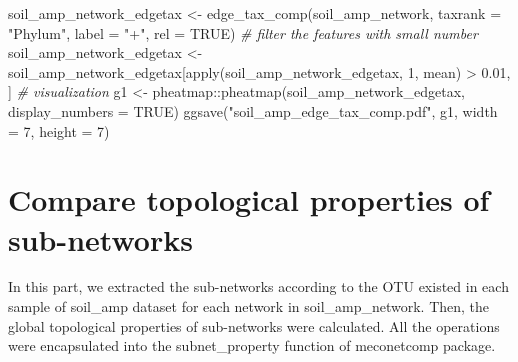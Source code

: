 \documentclass[
]{book}
\newenvironment{Shaded}{\begin{snugshade}}{\end{snugshade}}
\newcommand{\AttributeTok}[1]{\textcolor[rgb]{0.77,0.63,0.00}{#1}}
\newcommand{\CommentTok}[1]{\textcolor[rgb]{0.56,0.35,0.01}{\textit{#1}}}
\newcommand{\ConstantTok}[1]{\textcolor[rgb]{0.00,0.00,0.00}{#1}}
\newcommand{\DecValTok}[1]{\textcolor[rgb]{0.00,0.00,0.81}{#1}}
\newcommand{\FloatTok}[1]{\textcolor[rgb]{0.00,0.00,0.81}{#1}}
\newcommand{\FunctionTok}[1]{\textcolor[rgb]{0.00,0.00,0.00}{#1}}
\newcommand{\NormalTok}[1]{#1}
\newcommand{\OtherTok}[1]{\textcolor[rgb]{0.56,0.35,0.01}{#1}}
\newcommand{\SpecialCharTok}[1]{\textcolor[rgb]{0.00,0.00,0.00}{#1}}
\newcommand{\StringTok}[1]{\textcolor[rgb]{0.31,0.60,0.02}{#1}}
\begin{document}
\begin{Shaded}
\begin{Highlighting}[]
\NormalTok{soil\_amp\_network\_edgetax }\OtherTok{\textless{}{-}} \FunctionTok{edge\_tax\_comp}\NormalTok{(soil\_amp\_network, }\AttributeTok{taxrank =} \StringTok{"Phylum"}\NormalTok{, }\AttributeTok{label =} \StringTok{"+"}\NormalTok{, }\AttributeTok{rel =} \ConstantTok{TRUE}\NormalTok{)}
\CommentTok{\# filter the features with small number}
\NormalTok{soil\_amp\_network\_edgetax }\OtherTok{\textless{}{-}}\NormalTok{ soil\_amp\_network\_edgetax[}\FunctionTok{apply}\NormalTok{(soil\_amp\_network\_edgetax, }\DecValTok{1}\NormalTok{, mean) }\SpecialCharTok{\textgreater{}} \FloatTok{0.01}\NormalTok{, ]}
\CommentTok{\# visualization}
\NormalTok{g1 }\OtherTok{\textless{}{-}}\NormalTok{ pheatmap}\SpecialCharTok{::}\FunctionTok{pheatmap}\NormalTok{(soil\_amp\_network\_edgetax, }\AttributeTok{display\_numbers =} \ConstantTok{TRUE}\NormalTok{)}
\FunctionTok{ggsave}\NormalTok{(}\StringTok{"soil\_amp\_edge\_tax\_comp.pdf"}\NormalTok{, g1, }\AttributeTok{width =} \DecValTok{7}\NormalTok{, }\AttributeTok{height =} \DecValTok{7}\NormalTok{)}
\end{Highlighting}
\end{Shaded}

\hypertarget{compare-topological-properties-of-sub-networks}{%
\section{Compare topological properties of sub-networks}\label{compare-topological-properties-of-sub-networks}}

In this part, we extracted the sub-networks according to the OTU existed in each sample of soil\_amp dataset for each network in soil\_amp\_network.
Then, the global topological properties of sub-networks were calculated.
All the operations were encapsulated into the subnet\_property function of meconetcomp package.
\end{document}
